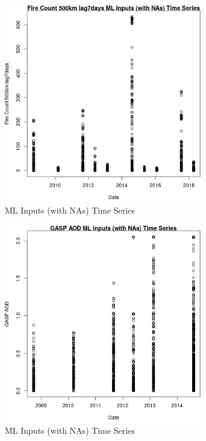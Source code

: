 \begin{figure} 
\centering  
\includegraphics[width=0.77\textwidth]{Code_Outputs/Report_ML_input_PM25_Step4_part_e_de_duplicated_aves_compiled_2019-05-18wNAs_Fire_Count_500km_lag7daysvDate.jpg} 
\caption{\label{fig:Report_ML_input_PM25_Step4_part_e_de_duplicated_aves_compiled_2019-05-18wNAsFire_Count_500km_lag7daysvDate}ML Inputs (with NAs) Time Series} 
\end{figure} 
 

\clearpage 

\begin{figure} 
\centering  
\includegraphics[width=0.77\textwidth]{Code_Outputs/Report_ML_input_PM25_Step4_part_e_de_duplicated_aves_compiled_2019-05-18wNAs_GASP_AODvDate.jpg} 
\caption{\label{fig:Report_ML_input_PM25_Step4_part_e_de_duplicated_aves_compiled_2019-05-18wNAsGASP_AODvDate}ML Inputs (with NAs) Time Series} 
\end{figure} 
 

